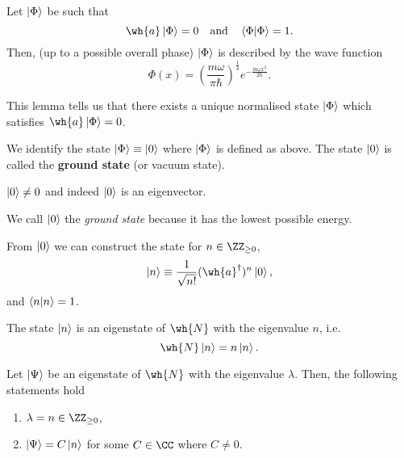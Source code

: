 \documentclass[12pt, a4paper]{article}
\begin{document}
\begin{mdlemma}
    Let \(\ket{\Phi}\) be such that 
    \[\wh{a}\ket{\Phi}=0 \quad \text{and} \quad \bra{\Phi}\ket{\Phi}=1.\]
    Then, (up to a possible overall phase) \(\ket{\Phi}\) is described by the wave function 
    \[\Phi(x)=\left( \frac{m\omega}{\pi \hbar} \right)^{\frac{1}{4}} e^{-\frac{m\omega x^2}{2\hbar}}.\]
\end{mdlemma}

\begin{mdnote}
    This lemma tells us that there exists a unique normalised state \(\ket{\Phi}\) which satisfies \(\wh{a} \ket{\Phi}=0\).
\end{mdnote}

\begin{definition}[Notation]
    We identify the state \(\ket{\Phi} \equiv \ket{0}\) where \(\ket{\Phi}\) is defined as above. The state \(\ket{0}\) is called the \textbf{ground state} (or vacuum state).
\end{definition}

\begin{mdremark}
    \(\ket{0} \neq 0\) and indeed \(\ket{0}\) is an eigenvector.
\end{mdremark}

\begin{mdnote}
    We call \(\ket{0}\) the \textit{ground state}  because it has the lowest possible energy.
\end{mdnote}

\begin{mdthm}
    From \(\ket{0}\) we can construct the state for \(n \in \ZZ_{\geq 0}\),
    \[\ket{n} \equiv \frac{1}{\sqrt{n!}} (\wh{a}^{\dagger})^n \ket{0},\]
    and \(\bra{n}\ket{n}=1\).
\end{mdthm}

\begin{corollary}
    The state \(\ket{n}\) is an eigenstate of \(\wh{N}\) with the eigenvalue \(n\), i.e.
    \[\wh{N}\ket{n}= n\ket{n}.\]
\end{corollary}

\begin{theorem}
    Let \(\ket{\Psi}\) be an eigenstate of \(\wh{N}\) with the eigenvalue \(\lambda\). Then, the following statements hold 
    \begin{enumerate}
        \item \(\lambda = n \in \ZZ_{\geq 0}\),
        \item \(\ket{\Psi} = C \ket{n}\) for some \(C \in \CC\) where \(C \neq 0\).
    \end{enumerate}
\end{theorem}
\end{document}
